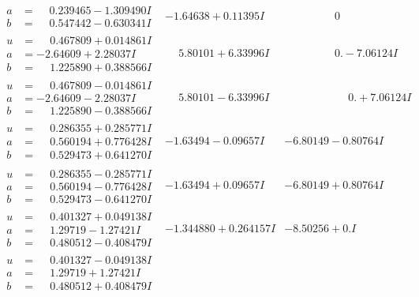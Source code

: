 \documentclass[1p]{elsarticle_modified}
\theoremstyle{definition}
\begin{document}
$$\begin{array}{c|c|c}
\begin{aligned}
a &= \phantom{-}0.239465 - 1.309490 I \\
b &= \phantom{-}0.547442 - 0.630341 I\end{aligned}
 & -1.64638 + 0.11395 I & \phantom{-0.000000 } 0 \\ \hline\begin{aligned}
u &= \phantom{-}0.467809 + 0.014861 I \\
a &= -2.64609 + 2.28037 I \\
b &= \phantom{-}1.225890 + 0.388566 I\end{aligned}
 & \phantom{-}5.80101 + 6.33996 I & \phantom{-0.000000 } 0. - 7.06124 I \\ \hline\begin{aligned}
u &= \phantom{-}0.467809 - 0.014861 I \\
a &= -2.64609 - 2.28037 I \\
b &= \phantom{-}1.225890 - 0.388566 I\end{aligned}
 & \phantom{-}5.80101 - 6.33996 I & \phantom{-0.000000 -}0. + 7.06124 I \\ \hline\begin{aligned}
u &= \phantom{-}0.286355 + 0.285771 I \\
a &= \phantom{-}0.560194 + 0.776428 I \\
b &= \phantom{-}0.529473 + 0.641270 I\end{aligned}
 & -1.63494 - 0.09657 I & -6.80149 - 0.80764 I \\ \hline\begin{aligned}
u &= \phantom{-}0.286355 - 0.285771 I \\
a &= \phantom{-}0.560194 - 0.776428 I \\
b &= \phantom{-}0.529473 - 0.641270 I\end{aligned}
 & -1.63494 + 0.09657 I & -6.80149 + 0.80764 I \\ \hline\begin{aligned}
u &= \phantom{-}0.401327 + 0.049138 I \\
a &= \phantom{-}1.29719 - 1.27421 I \\
b &= \phantom{-}0.480512 - 0.408479 I\end{aligned}
 & -1.344880 + 0.264157 I & -8.50256 + 0. I\phantom{ +0.000000I} \\ \hline\begin{aligned}
u &= \phantom{-}0.401327 - 0.049138 I \\
a &= \phantom{-}1.29719 + 1.27421 I \\
b &= \phantom{-}0.480512 + 0.408479 I\end{aligned}

\end{array}$$
\end{document}
